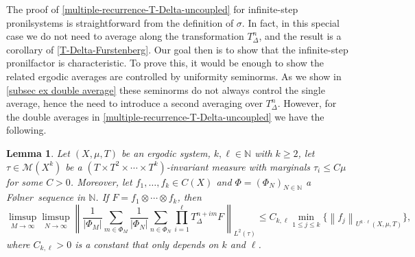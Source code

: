 \documentclass[letter, 11pt]{article}
\newcommand{\Folner}{F\o{}lner}
\newtheorem{lemma}[theo]{Lemma}
\theoremstyle{definition}
\theoremstyle{plain}
\newcommand{\N}{\mathbb{N}}
\newcommand{\cM}{\mathcal{M}}
\newcommand{\norm}[1]{\left\lVert#1\right\rVert}
\providecommand{\norm}[1]{\lVert #1\rVert}
\newcommand{\1}{\mathbbm{1}}
\begin{document}
The proof of \cref{multiple-recurrence-T-Delta-uncoupled} for infinite-step pronilsystems is straightforward from the definition of $\sigma$. In fact, in this special case we do not need to average along the transformation $T_\Delta^n$, and the result is a corollary of \cref{T-Delta-Furstenberg}. Our goal then is to show that the infinite-step pronilfactor is characteristic. To prove this, it would be enough to show the related ergodic averages are controlled by uniformity seminorms. As we show in \cref{subsec ex double average} these seminorms do not always control the single average, hence the need to introduce a second averaging over $T_\Delta^n$. However, for the double averages in \cref{multiple-recurrence-T-Delta-uncoupled} we have the following.

\begin{lemma}\label{projection-lemma-for-qmri}
Let $(X, \mu,T)$ be an ergodic system, $k,\ell \in \N$ with $k\geq 2$, let $\tau\in \cM(X^{k})$ be a $(T\times T^2 \times \cdots \times T^k)$-invariant measure with marginals $\tau_i \leq C \mu $ for some $C>0$. Moreover, let $f_1, \ldots, f_k  \in C(X)$ and $\Phi=(\Phi_N)_{N \in \N}$ a \Folner\ sequence in $\N$. If $F= f_1 \otimes  \cdots \otimes f_k $, then
\begin{equation*}
    \limsup_{M \to \infty} \limsup_{N \to \infty} \norm{ \frac{1}{|\Phi_M|} \sum_{m \in \Phi_M} \frac{1}{|\Phi_N|} \sum_{n \in \Phi_N} \prod_{i=1}^{\ell} T_\Delta^{n+im}  F }_{L^2(\tau)} \leq C_{k,\ell} \min_{1\leq j\leq k}\{\norm{f_j}_{U^{k \cdot \ell}(X,\mu,T)} \},
\end{equation*} 
where $ C_{k,\ell}>0$ is a constant that only depends on $k$ and $\ell$.
\end{lemma}
\end{document}
